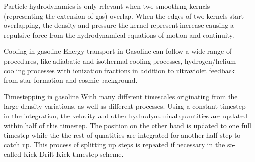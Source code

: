 Particle hydrodynamics is only relevant when two smoothing kernels (representing the extension of gas) overlap. When the edges of two kernels start overlapping, the density and pressure the kernel represent increase causing a repulsive force from the hydrodynamical equations of motion and continuity.

Cooling in gasoline
Energy transport in Gasoline can follow a wide range of procedures, like adiabatic and isothermal cooling processes, hydrogen/helium cooling processes with ionization fractions in addition to ultraviolet feedback from star formation and cosmic background.

Timestepping in gasoline
With many different timescales originating from the large density variations, as well as different processes.
Using a constant timestep in the integration, the velocity and other hydrodynamical quantities are updated within half of this timestep.
The position on the other hand is updated to one full timestep while the the rest of qunatities are integrated for another half-step to catch up. This process of splitting up steps is repeated if necessary in the so-called Kick-Drift-Kick timestep scheme.
